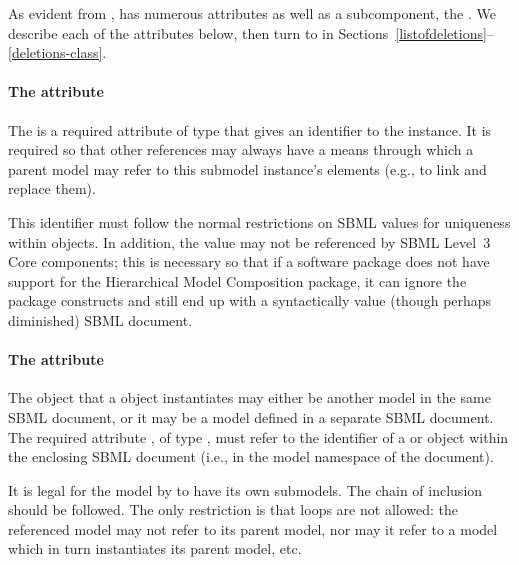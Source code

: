 As evident from , \Submodel has numerous attributes as
well as a subcomponent, the .  We describe each
of the attributes below, then turn to  in
Sections~\ref{listofdeletions}--\ref{deletions-class}.


\paragraph{The \hspace*{1pt} attribute}

The  is a required attribute of type  that gives
an identifier to the \Submodel instance.  It is required so that other
references may always have a means through which a parent model may
refer to this submodel instance's elements (e.g., to link and replace
them).

This identifier must follow the normal restrictions on SBML
 values for uniqueness within \Model objects.  In
addition, the  value may not be referenced by SBML Level~3
Core components; this is necessary so that if a software package does
not have support for the Hierarchical Model Composition package, it can
ignore the package constructs and still end up with a syntactically
value (though perhaps diminished) SBML document.


\paragraph{The \hspace*{1pt} attribute}
  
The \Model object that a \Submodel object instantiates may either be
another model in the same SBML document, or it may be a model defined in
a separate SBML document.  The required attribute , of
type , must refer to the identifier of a \Model or
\ExternalModelDefinition object within the enclosing SBML document
(i.e., in the model namespace of the document).  

It is legal for the model by  to have its own submodels.
The chain of inclusion should be followed.  The only restriction is that
loops are not allowed: the referenced model may not refer to its parent
model, nor may it refer to a model which in turn instantiates its parent
model, etc.

